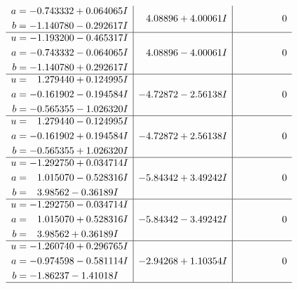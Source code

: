 \documentclass[1p]{elsarticle_modified}
\theoremstyle{definition}
\begin{document}
$$\begin{array}{c|c|c}
\begin{aligned}
a &= -0.743332 + 0.064065 I \\
b &= -1.140780 - 0.292617 I\end{aligned}
 & \phantom{-}4.08896 + 4.00061 I & \phantom{-0.000000 } 0 \\ \hline\begin{aligned}
u &= -1.193200 - 0.465317 I \\
a &= -0.743332 - 0.064065 I \\
b &= -1.140780 + 0.292617 I\end{aligned}
 & \phantom{-}4.08896 - 4.00061 I & \phantom{-0.000000 } 0 \\ \hline\begin{aligned}
u &= \phantom{-}1.279440 + 0.124995 I \\
a &= -0.161902 - 0.194584 I \\
b &= -0.565355 - 1.026320 I\end{aligned}
 & -4.72872 - 2.56138 I & \phantom{-0.000000 } 0 \\ \hline\begin{aligned}
u &= \phantom{-}1.279440 - 0.124995 I \\
a &= -0.161902 + 0.194584 I \\
b &= -0.565355 + 1.026320 I\end{aligned}
 & -4.72872 + 2.56138 I & \phantom{-0.000000 } 0 \\ \hline\begin{aligned}
u &= -1.292750 + 0.034714 I \\
a &= \phantom{-}1.015070 - 0.528316 I \\
b &= \phantom{-}3.98562 - 0.36189 I\end{aligned}
 & -5.84342 + 3.49242 I & \phantom{-0.000000 } 0 \\ \hline\begin{aligned}
u &= -1.292750 - 0.034714 I \\
a &= \phantom{-}1.015070 + 0.528316 I \\
b &= \phantom{-}3.98562 + 0.36189 I\end{aligned}
 & -5.84342 - 3.49242 I & \phantom{-0.000000 } 0 \\ \hline\begin{aligned}
u &= -1.260740 + 0.296765 I \\
a &= -0.974598 - 0.581114 I \\
b &= -1.86237 - 1.41018 I\end{aligned}
 & -2.94268 + 1.10354 I & \phantom{-0.000000 } 0\\
 \hline 
 \end{array}$$\newpage$$\begin{array}{c|c|c}  

\end{array}$$
\end{document}
